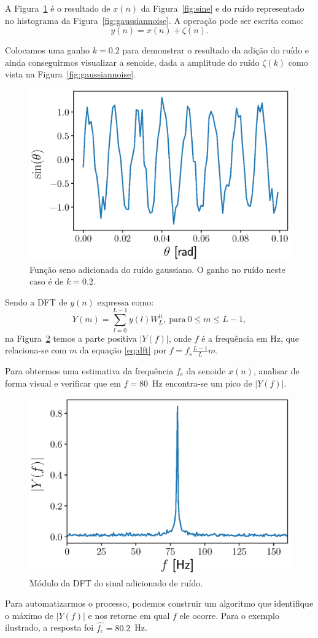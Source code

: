 \documentclass{homeworkclass}
\begin{document}
\begin{homeworkProblem}
	A Figura~\ref{fig:sineandnoise} é o resultado de $x(n)$ da Figura~\ref{fig:sine} e do ruído representado no histograma da Figura~\ref{fig:gaussiannoise}. A operação pode ser escrita como:
	\begin{equation*}
	y(n) = x(n) + \zeta(n).
	\end{equation*}
	
	Colocamos uma ganho $k = 0.2$ para demonstrar o resultado da adição do ruído e ainda conseguirmos visualizar a senoide, dada a amplitude do ruído $\zeta(k)$ como vista na Figura~\ref{fig:gaussiannoise}.
	\begin{figure}[!h]
		\centering
		\includegraphics[width=0.6\linewidth]{figs/sine_and_noise}
		\caption{Função seno adicionada do ruído gaussiano. O ganho no ruído neste caso é de $k = 0.2$.}
		\label{fig:sineandnoise}
	\end{figure}

	Sendo a DFT de $y(n)$ expressa como: 
	\begin{equation}\label{eq:dft}
	Y(m) = \sum_{l=0}^{L - 1} y(l) W^{li}_L, ~\textrm{para}~ 0 \leq m \leq L - 1,
	\end{equation}
	na Figura~\ref{fig:dft} temos a parte positiva $|Y(f)|$, onde $f$ é a frequência em Hz, que relaciona-se com $m$ da equação \eqref{eq:dft} por $f = f_{s}\frac{L-1}{L}m$. 

	Para obtermos uma estimativa da frequência $f_{c}$ da senoide $x(n)$, analisar de forma visual e verificar que em $f = 80$~Hz encontra-se um pico de $|Y(f)|$.
	\begin{figure}[!ht]
		\centering
		\includegraphics[width=0.7\linewidth]{figs/dft}
		\caption{Módulo da DFT do sinal adicionado de ruído.}
		\label{fig:dft}
	\end{figure}
	Para automatizarmos o processo, podemos construir um algoritmo que identifique o máximo de $|Y(f)|$ e nos retorne em qual $f$ ele ocorre. Para o exemplo ilustrado, a resposta foi $\hat{f_c} = 80.2$~Hz.
	

\end{homeworkProblem}
\end{document}
